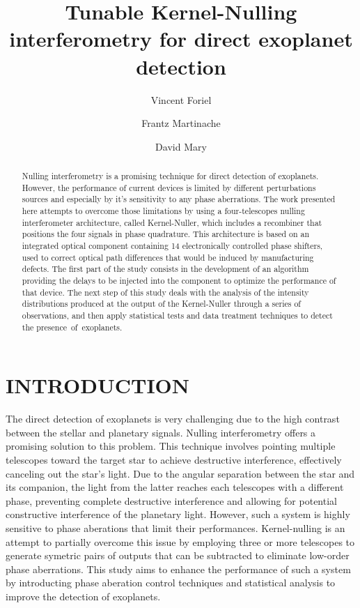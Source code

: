 \documentclass[]{spie}  %
\title{Tunable Kernel-Nulling interferometry for direct exoplanet detection}
\author[a,*]{Vincent Foriel}
\author[a]{Frantz Martinache}
\author[a]{David Mary}
\affil[a]{Université Côte d’Azur, Observatoire de la Côte d’Azur Nice, CNRS, Laboratoire Lagrange, Nice, France}
\begin{document}
\maketitle

\begin{abstract}

    Nulling interferometry\cite{Bracewell} is a promising technique for direct detection of exoplanets. However, the performance of current devices is limited by different perturbations sources \cite{Lay et al. 2004} and especially by it's sensitivity to any phase aberrations. The work presented here attempts to overcome those limitations by using a four-telescopes nulling interferometer architecture, called Kernel-Nuller\cite{Martinache et al. 2018}, which includes a recombiner that positions the four signals in phase quadrature. This architecture is based on an integrated optical component containing 14 electronically controlled phase shifters, used to correct optical path differences that would be induced by manufacturing defects. The first part of the study consists in the development of an algorithm providing the delays to be injected into the component to optimize the performance of that device. The next step of this study deals with the analysis of the intensity distributions produced at the output of the Kernel-Nuller\cite{Martinache et al. 2018, Cvetojevic et al. 2022} through a series of observations, and then apply statistical tests and data treatment techniques to detect the presence of exoplanets.

\end{abstract}


\section{INTRODUCTION}
\label{sec:intro} %

The direct detection of exoplanets is very challenging due to the high contrast between the stellar and planetary signals. Nulling interferometry offers a promising solution to this problem. This technique involves pointing multiple telescopes toward the target star to achieve destructive interference, effectively canceling out the star's light. Due to the angular separation between the star and its companion, the light from the latter reaches each telescopes with a different phase, preventing complete destructive interference and allowing for potential constructive interference of the planetary light. However, such a system is highly sensitive to phase aberations that limit their performances. Kernel-nulling is an attempt to partially overcome this issue by employing three or more\cite{N telescope kernel} telescopes to generate symetric pairs of outputs that can be subtracted to eliminate low-order phase aberrations\cite{Martinache et al. 2018}. This study aims to enhance the performance of such a system by introducting phase aberation control techniques and statistical analysis to improve the detection of exoplanets.
\end{document}
